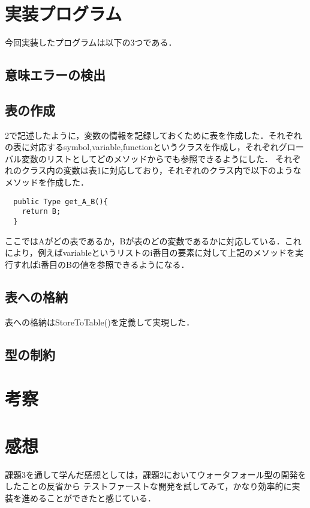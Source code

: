 \documentclass[dvipdfmx]{jarticle}
\begin{document}
\section{実装プログラム}
今回実装したプログラムは以下の3つである．
\subsection{意味エラーの検出}
\subsection{表の作成}
2で記述したように，変数の情報を記録しておくために表を作成した．それぞれの表に対応するsymbol,variable,functionというクラスを作成し，それぞれグローバル変数のリストとしてどのメソッドからでも参照できるようにした．
それぞれのクラス内の変数は表1に対応しており，それぞれのクラス内で以下のようなメソッドを作成した．
\begin{lstlisting}
  public Type get_A_B(){
    return B;
  }
\end{lstlisting}
ここではAがどの表であるか，Bが表のどの変数であるかに対応している．これにより，例えばvariableというリストのi番目の要素に対して上記のメソッドを実行すればi番目のBの値を参照できるようになる．
\subsection{表への格納}
表への格納はStoreToTable()を定義して実現した．

\subsection{型の制約}
\section{考察}
\section{感想}
課題3を通して学んだ感想としては，課題2においてウォータフォール型の開発をしたことの反省から
テストファーストな開発を試してみて，かなり効率的に実装を進めることができたと感じている．
\begin{thebibliography}{1}
\end{thebibliography}
\end{document}
